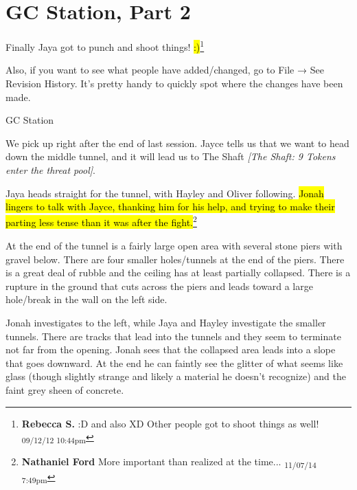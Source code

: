 \setcounter{chapter}{ 6 }
\chapter{\textbf{GC Station, Part 2} }





Finally Jaya got to punch and shoot things!   \hl{:)}\footnote{\textbf{Rebecca S. }:D  and also  XD  
Other people got to shoot things as well! \textsubscript{09/12/12 10:44pm}}



Also, if you want to see what people have added/changed, go to File → See Revision History.  It's pretty handy to quickly spot where the changes have been made.



\noindent\hrulefill





 {\LARGE GC Station } 



We pick up right after the end of last session.  Jayce tells us that we want to head down the middle tunnel, and it will lead us to The Shaft \textit{{[}The Shaft: 9 Tokens enter the threat pool{]}}.



Jaya heads straight for the tunnel, with Hayley and Oliver following.  \hl{Jonah lingers to talk with Jayce, thanking him for his help, and trying to make their parting less tense than it was after the fight.}\footnote{\textbf{Nathaniel Ford }More important than realized at the time... \textsubscript{11/07/14 7:49pm}}



At the end of the tunnel is a fairly large open area with several stone piers with gravel below.  There are four smaller holes/tunnels at the end of the piers.  There is a great deal of rubble and the ceiling has at least partially collapsed.  There is a rupture in the ground that cuts across the piers and leads toward a large hole/break in the wall on the left side.  



Jonah investigates to the left, while Jaya and Hayley investigate the smaller tunnels. There are tracks that lead into the tunnels and they seem to terminate not far from the opening.  Jonah sees that the collapsed area leads into a slope that goes downward.  At the end he can faintly see the glitter of what seems like glass (though slightly strange and likely a material he doesn't recognize) and the faint grey sheen of concrete.



